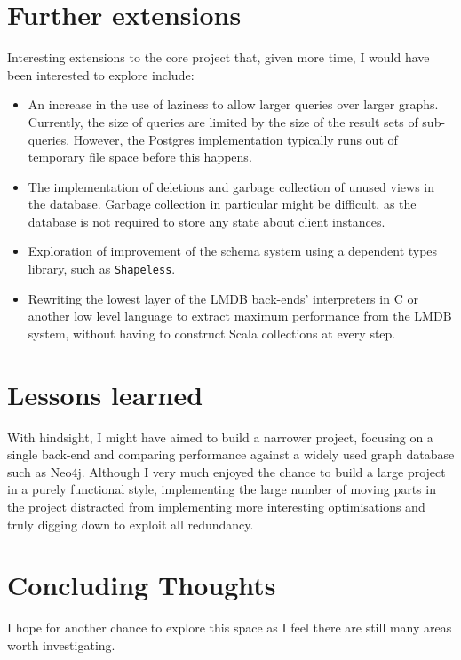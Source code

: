 \documentclass[12pt,a4paper,twoside,openright]{report}
\newcommand\codeName[1]{\texttt{#1}}
\begin{document}
\section{Further extensions}
Interesting extensions to the core project that, given more time, I would have been interested to explore include:
\begin{itemize}
 \item An increase in the use of laziness to allow larger queries over larger graphs. Currently, the size of queries are limited by the size of the result sets of sub-queries. However, the Postgres implementation typically runs out of temporary file space before this happens.
 \item The implementation of deletions and garbage collection of unused views in the database. Garbage collection in particular might be difficult, as the database is not required to store any state about client instances.
 \item Exploration of  improvement of the schema system using a dependent types library, such as \codeName{Shapeless}.
 \item Rewriting the lowest layer of the LMDB back-ends' interpreters in C or another low level language to extract maximum performance from the LMDB system, without having to construct Scala collections at every step.
\end{itemize}

\section{Lessons learned}
	With hindsight, I might have aimed to build a narrower project, focusing on a single back-end and comparing  performance against a widely used graph database such as Neo4j. Although I very much enjoyed the chance to build a large project in a purely functional style, implementing the large number of moving parts in the project distracted from implementing more interesting optimisations and truly digging down to exploit all redundancy.

\section{Concluding Thoughts}
I hope for another chance to explore this space as I feel there are still many areas worth investigating.





\end{document}
